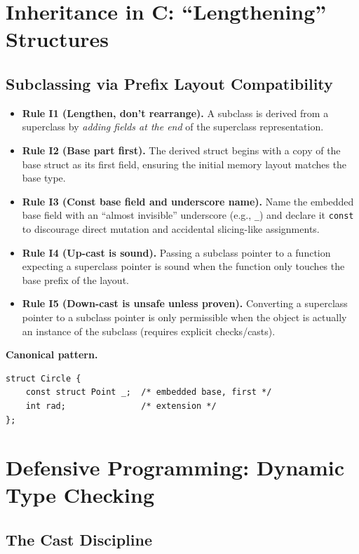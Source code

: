 \documentclass[11pt]{article}
\begin{document}
\section{Inheritance in C: ``Lengthening'' Structures}

\subsection{Subclassing via Prefix Layout Compatibility}

\begin{itemize}
  \item \textbf{Rule I1 (Lengthen, don't rearrange).} A subclass is derived from a superclass by \emph{adding fields at the end} of the superclass representation.
  \item \textbf{Rule I2 (Base part first).} The derived struct begins with a copy of the base struct as its first field, ensuring the initial memory layout matches the base type.
  \item \textbf{Rule I3 (Const base field and underscore name).} Name the embedded base field with an ``almost invisible'' underscore (e.g., \texttt{\_}) and declare it \texttt{const} to discourage direct mutation and accidental slicing-like assignments.
  \item \textbf{Rule I4 (Up-cast is sound).} Passing a subclass pointer to a function expecting a superclass pointer is sound when the function only touches the base prefix of the layout.
  \item \textbf{Rule I5 (Down-cast is unsafe unless proven).} Converting a superclass pointer to a subclass pointer is only permissible when the object is actually an instance of the subclass (requires explicit checks/casts).
\end{itemize}

\noindent\textbf{Canonical pattern.}
\begin{verbatim}
struct Circle {
    const struct Point _;  /* embedded base, first */
    int rad;               /* extension */
};
\end{verbatim}

\section{Defensive Programming: Dynamic Type Checking}

\subsection{The Cast Discipline}
\end{document}

